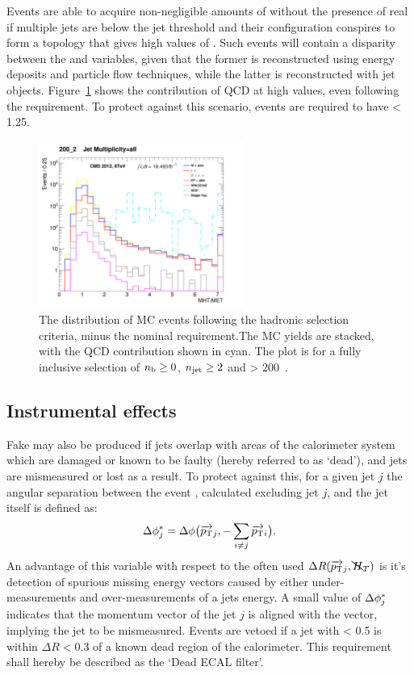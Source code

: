 Events are able to acquire non-negligible amounts of \mht without the presence
of
real \met if multiple jets are below the jet \Pt threshold and their
configuration conspires to form a topology that gives high values of \alphat.
Such events will contain a disparity between the \met and
\mht variables, given that the former is reconstructed using energy deposits
and particle flow techniques, while the latter is reconstructed with jet objects.
Figure~\ref{fig:full_mhtmet_distro} shows the contribution of QCD at
high \mhtmet values, even following the \alphat requirement.
To protect against this scenario, events are required to have \mhtmet < 1.25.

\begin{figure}[t]
\centering
\includegraphics[width=0.6\textwidth]
{Figs/datamc/had/v1/Stacked_MHTovMET_all_200_upwards.png}
\caption{The \mhtmet distribution of MC events following the hadronic selection
criteria, minus the nominal \mhtmet requirement.The MC yields are stacked,
with the QCD contribution shown in cyan. The plot is for a fully inclusive
selection of $n_{\text{b}} \geq 0$, $n_{\text{jet}} \geq 2$ and \HT > 200~\gev.}
\label{fig:full_mhtmet_distro}
\end{figure}

\subsection{Instrumental effects}

Fake \mht may also be produced if jets overlap with areas of the calorimeter 
system which are damaged or known to be faulty (hereby referred to as `dead'),
and jets are mismeasured or lost as a result. To protect against this, for a
given jet $j$ the angular separation between the event \mht, calculated
excluding jet $j$, and the jet itself is defined as:
% 
\begin{equation}
\Delta \phi^*_j = \Delta \phi\big(\overrightarrow{{p_{\text T}}}_j,-\sum_{i\neq j}
{\overrightarrow{{p_{\text T}}}_i}\big) .
\label{eq:biasdphi}
\end{equation}
% 
An advantage of this variable with respect to the often used
$\Delta R(\overrightarrow{{p_{\text T}}}_j, \bcancel{H}_T)$ is it's detection of spurious missing
energy vectors
caused
by either under-measurements and over-measurements of a jets energy.
A small value of $\Delta \phi^*_j$ indicates that the momentum vector of the jet $j$
is aligned with the \mht vector, implying the jet to be mismeasured. Events are
vetoed if a jet with \dphistar< 0.5 is within $\Delta R < 0.3$ of a known
dead region of the calorimeter. This requirement shall hereby be described as
the `Dead ECAL filter'.

